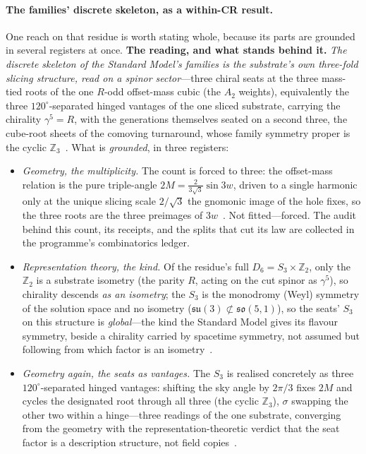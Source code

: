 \documentclass[11pt,a4paper]{article}
\theoremstyle{definition}
\begin{document}
\paragraph{The families' discrete skeleton, as a within-CR result.} One reach on that residue is worth
stating whole, because its parts are grounded in several registers at once. \textbf{The reading, and what
stands behind it.} \emph{The discrete skeleton of the Standard Model's families is the substrate's own three-fold
slicing structure, read on a spinor sector}---three chiral seats at the three mass-tied roots of the one
$R$-odd offset-mass cubic (the $A_2$ weights), equivalently the three
$120^\circ$-separated hinged vantages of the one sliced substrate, carrying the
chirality $\gamma^5=R$, with the generations themselves seated on a second three, the cube-root sheets of
the comoving turnaround, whose family symmetry proper is the cyclic
$\mathbb{Z}_3$~\cite{JanzenMatter}. What is \emph{grounded}, in three registers:
\begin{itemize}
\item \emph{Geometry, the multiplicity.} The count is forced to three: the
offset-mass relation is the pure triple-angle $2M=\tfrac{2}{3\sqrt3}\sin 3w$,
driven to a single harmonic only at the unique slicing scale $2/\sqrt3$ the
gnomonic image of the hole fixes, so the three roots are the three preimages of
$3w$~\cite{JanzenSlicing}. Not fitted---forced. The audit behind this count, its receipts, and the splits
that cut its law are collected in the programme's combinatorics ledger.
\item \emph{Representation theory, the kind.} Of the residue's full
$D_6=S_3\times\mathbb{Z}_2$, only the $\mathbb{Z}_2$ is a substrate isometry
(the parity $R$, acting on the cut spinor as $\gamma^5$), so chirality descends \emph{as an isometry}; the $S_3$ is the monodromy (Weyl) symmetry of the solution space and
no isometry ($\mathfrak{su}(3)\not\subset\mathfrak{so}(5,1)$), so the seats' $S_3$
on this structure is \emph{global}---the kind the Standard Model gives its flavour symmetry, beside a chirality carried by spacetime symmetry, not assumed but following from which factor is an
isometry~\cite{JanzenBoundary,JanzenAlgebroid,JanzenGroupoid}.
\item \emph{Geometry again, the seats as vantages.} The $S_3$ is realised
concretely as three $120^\circ$-separated hinged vantages: shifting the sky
angle by $2\pi/3$ fixes $2M$ and cycles the designated root through all three
(the cyclic $\mathbb{Z}_3$), $\sigma$ swapping the other two within a
hinge---three readings of the one substrate, converging from the geometry with
the representation-theoretic verdict that the seat factor is a description
structure, not field copies~\cite{JanzenSlicing}.
\end{itemize}
\end{document}
